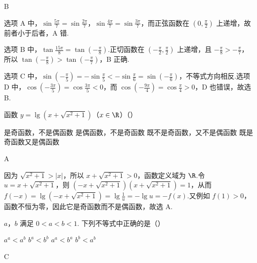 \documentclass[UTF8,a4paper,oneside,11pt]{ctexbook}
\begin{document}
\begin{answer}
B
\end{answer}

\begin{solution}
选项 A 中，\(\sin\frac{5\pi}{7}=\sin\frac{2\pi}{7}\)，\(\sin\frac{4\pi}{7}=\sin\frac{3\pi}{7}\)，而正弦函数在 \((0,\frac{\pi}{2})\) 上递增，故前者小于后者，A 错.

选项 B 中，\(\tan\frac{15\pi}{8}=\tan\left(-\frac{\pi}{8}\right)\).正切函数在 \((-\frac{\pi}{2},\frac{\pi}{2})\) 上递增，且 \(-\frac{\pi}{8}>-\frac{\pi}{7}\)，所以
\(\tan\left(-\frac{\pi}{8}\right)>\tan\left(-\frac{\pi}{7}\right)\)，B 正确.

选项 C 中，\(\sin\left(-\frac{\pi}{5}\right)=-\sin\frac{\pi}{5}<-\sin\frac{\pi}{6}=\sin\left(-\frac{\pi}{6}\right)\)，不等式方向相反.选项 D 中，\(\cos\left(-\frac{3\pi}{5}\right)=\cos\frac{3\pi}{5}<0\)，而 \(\cos\left(-\frac{9\pi}{4}\right)=\cos\frac{\pi}{4}>0\)，D 也错误，故选 B.
\end{solution}

\begin{problem}

函数 \(y=\lg \left( x+\sqrt{x^2+1} \right)\)（\(x\in\R\)）（\quad）

\choices
    {是奇函数，不是偶函数}
    {是偶函数，不是奇函数}
    {既不是奇函数，又不是偶函数}
    {既是奇函数又是偶函数}
\end{problem}

\begin{answer}
A
\end{answer}

\begin{solution}
因为 \(\sqrt{x^2+1}>|x|\)，所以 \(x+\sqrt{x^2+1}>0\)，函数定义域为 \(\R\).令
\(u=x+\sqrt{x^2+1}\)，则
\(\left(-x+\sqrt{x^2+1}\right)\left(x+\sqrt{x^2+1}\right)=1\)，从而
\(f(-x)=\lg\left(-x+\sqrt{x^2+1}\right)=\lg\frac{1}{u}=-\lg u=-f(x)\).又例如 \(f(1)>0\)，函数不恒为零，因此它是奇函数而不是偶函数，故选 A.
\end{solution}

\begin{problem}

\(a\)，\(b\) 满足 \(0<a<b<1\). 下列不等式中正确的是（\quad）

\choices
    {\(a^a<a^b\)}
    {\(b^a<b^b\)}
    {\(a^a<b^a\)}
    {\(b^b<a^b\)}
\end{problem}

\begin{answer}
C
\end{answer}
\end{document}
